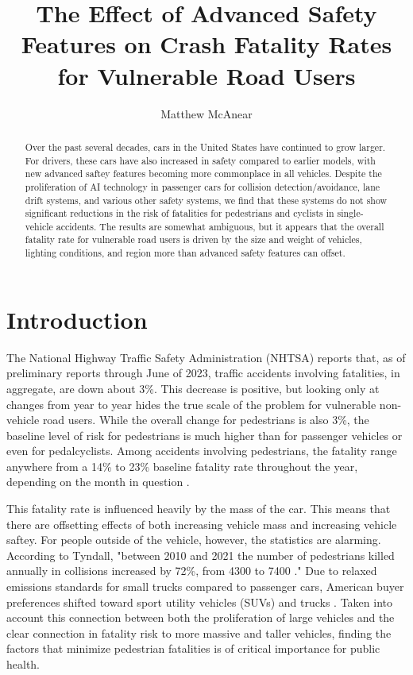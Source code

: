 \documentclass[12pt]{article}
\author{Matthew McAnear}
\title{The Effect of Advanced Safety Features on Crash Fatality Rates for Vulnerable Road Users}
\begin{document}
\maketitle

\begin{abstract}
    Over the past several decades, cars in the United States have continued to grow larger. For drivers, these cars
    have also increased in safety compared to earlier models, with new advanced saftey features becoming more
    commonplace in all vehicles. Despite the proliferation of AI technology in passenger cars for collision
    detection/avoidance, lane drift systems, and various other safety systems, we find that these systems do not
    show significant reductions in the risk of fatalities for pedestrians and cyclists in single-vehicle accidents. The
    results are somewhat ambiguous, but it appears that the overall fatality rate for vulnerable road users is driven
    by the size and weight of vehicles, lighting conditions, and region more than advanced safety features can offset.
\end{abstract}


\section{Introduction}

The National Highway Traffic Safety Administration (NHTSA) reports that, as of preliminary reports through
June of 2023, traffic accidents involving fatalities, in aggregate, are down about 3\%. This decrease is positive,
but looking only at changes from year to year hides the true scale of the problem for vulnerable non-vehicle
road users. While the overall change for pedestrians is also 3\%, the baseline level of risk for pedestrians is
much higher than for passenger vehicles or even for pedalcyclists. Among accidents involving pedestrians, the fatality
range anywhere from a 14\% to 23\% baseline fatality rate throughout the year, depending on the month in
question \cite{national_highway_traffic_safety_administration_early_2024}.

This fatality rate is influenced heavily by the mass of the car\cite{evans_car_1992}. This means that there
are offsetting effects of both increasing vehicle mass and increasing
vehicle saftey. For people outside of the vehicle, however, the statistics are alarming. According to Tyndall,
"between 2010 and 2021 the number of pedestrians killed annually in collisions increased by 72\%, from 4300 to
7400 \cite{tyndall_effect_2024}." Due to relaxed emissions standards for small trucks compared to passenger cars,
American buyer preferences shifted toward sport utility vehicles (SUVs) and trucks \cite{kovach_rise_2021}. Taken into
account this connection between both the proliferation of large vehicles and the clear connection in fatality risk to
more massive and taller vehicles\cite{tyndall_effect_2024}, finding the factors that minimize pedestrian fatalities
is of critical importance for public health.
\end{document}
